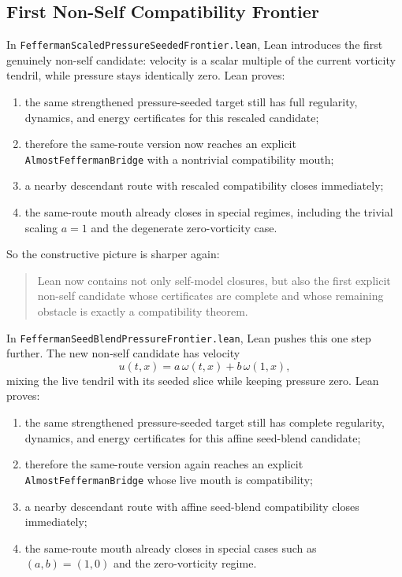 \documentclass[11pt]{article}
\begin{document}
\subsection{First Non-Self Compatibility Frontier}

In \texttt{FeffermanScaledPressureSeededFrontier.lean}, Lean introduces the
first genuinely non-self candidate: velocity is a scalar multiple of the
current vorticity tendril, while pressure stays identically zero.  Lean proves:
\begin{enumerate}[leftmargin=1.5em]
  \item the same strengthened pressure-seeded target still has full regularity,
  dynamics, and energy certificates for this rescaled candidate;
  \item therefore the same-route version now reaches an explicit
  \texttt{AlmostFeffermanBridge} with a nontrivial compatibility mouth;
  \item a nearby descendant route with rescaled compatibility closes
  immediately;
  \item the same-route mouth already closes in special regimes, including the
  trivial scaling \(a=1\) and the degenerate zero-vorticity case.
\end{enumerate}

So the constructive picture is sharper again:
\begin{quote}
Lean now contains not only self-model closures, but also the first explicit
non-self candidate whose certificates are complete and whose remaining obstacle
is exactly a compatibility theorem.
\end{quote}

In \texttt{FeffermanSeedBlendPressureFrontier.lean}, Lean pushes this one step
further.  The new non-self candidate has velocity
\[
u(t,x) = a\,\omega(t,x) + b\,\omega(1,x),
\]
mixing the live tendril with its seeded slice while keeping pressure zero.
Lean proves:
\begin{enumerate}[leftmargin=1.5em]
  \item the same strengthened pressure-seeded target still has complete
  regularity, dynamics, and energy certificates for this affine seed-blend
  candidate;
  \item therefore the same-route version again reaches an explicit
  \texttt{AlmostFeffermanBridge} whose live mouth is compatibility;
  \item a nearby descendant route with affine seed-blend compatibility closes
  immediately;
  \item the same-route mouth already closes in special cases such as
  \((a,b)=(1,0)\) and the zero-vorticity regime.
\end{enumerate}
\end{document}
